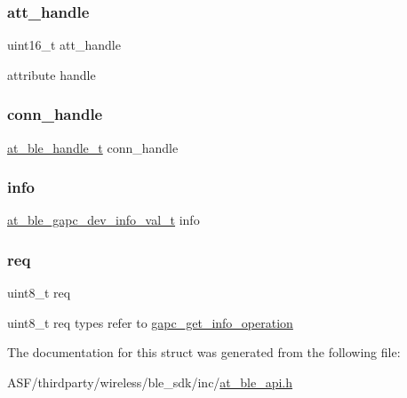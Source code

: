 \subsubsection{\texorpdfstring{att\_handle}{att\_handle}}
{\footnotesize\ttfamily uint16\+\_\+t att\+\_\+handle}

attribute handle \mbox{\label{structat__ble__peer__att__info__ind__t_ae42df6fd8493f8f8faeccfdd6062e96f}} 
\subsubsection{\texorpdfstring{conn\_handle}{conn\_handle}}
{\footnotesize\ttfamily \mbox{\hyperlink{at__ble__api_8h_abd23646d0c662860741f787efc8456f2}{at\+\_\+ble\+\_\+handle\+\_\+t}} conn\+\_\+handle}

\mbox{\label{structat__ble__peer__att__info__ind__t_ae74077355aa2f0a20c47a7d162d666cd}} 
\subsubsection{\texorpdfstring{info}{info}}
{\footnotesize\ttfamily \mbox{\hyperlink{unionat__ble__gapc__dev__info__val__t}{at\+\_\+ble\+\_\+gapc\+\_\+dev\+\_\+info\+\_\+val\+\_\+t}} info}

\mbox{\label{structat__ble__peer__att__info__ind__t_aee31b0c3b9c08cd76406c7bd7cf74642}} 
\subsubsection{\texorpdfstring{req}{req}}
{\footnotesize\ttfamily uint8\+\_\+t req}

uint8\+\_\+t req types refer to \mbox{\hyperlink{at__ble__api_8h_a2d6323d78f92f4d989850837f93b6aaf}{gapc\+\_\+get\+\_\+info\+\_\+operation}} 

The documentation for this struct was generated from the following file\+:\begin{DoxyCompactItemize}
\item 
A\+S\+F/thirdparty/wireless/ble\+\_\+sdk/inc/\mbox{\hyperlink{at__ble__api_8h}{at\+\_\+ble\+\_\+api.\+h}}\end{DoxyCompactItemize}
